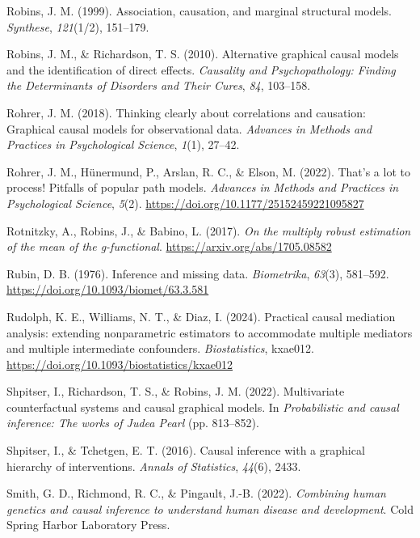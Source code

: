 \documentclass[
  single column]{article}
\newlength{\cslhangindent}
\newenvironment{CSLReferences}[2] %
 {\begin{list}{}{%
  \setlength{\itemindent}{0pt}
  \setlength{\leftmargin}{0pt}
  \setlength{\parsep}{0pt}
  \ifodd #1
   \setlength{\leftmargin}{\cslhangindent}
   \setlength{\itemindent}{-1\cslhangindent}
  \fi
  \setlength{\itemsep}{#2\baselineskip}}}
 {\end{list}}
\begin{document}
\begin{CSLReferences}{1}{0}
Robins, J. M. (1999). Association, causation, and marginal structural
models. \emph{Synthese}, \emph{121}(1/2), 151--179.

Robins, J. M., \& Richardson, T. S. (2010). Alternative graphical causal
models and the identification of direct effects. \emph{Causality and
Psychopathology: Finding the Determinants of Disorders and Their Cures},
\emph{84}, 103--158.

Rohrer, J. M. (2018). Thinking clearly about correlations and causation:
Graphical causal models for observational data. \emph{Advances in
Methods and Practices in Psychological Science}, \emph{1}(1), 27--42.

Rohrer, J. M., Hünermund, P., Arslan, R. C., \& Elson, M. (2022). That's
a lot to process! Pitfalls of popular path models. \emph{Advances in
Methods and Practices in Psychological Science}, \emph{5}(2).
\url{https://doi.org/10.1177/25152459221095827}

Rotnitzky, A., Robins, J., \& Babino, L. (2017). \emph{On the multiply
robust estimation of the mean of the g-functional}.
\url{https://arxiv.org/abs/1705.08582}

Rubin, D. B. (1976). Inference and missing data. \emph{Biometrika},
\emph{63}(3), 581--592. \url{https://doi.org/10.1093/biomet/63.3.581}

Rudolph, K. E., Williams, N. T., \& Diaz, I. (2024). {Practical causal
mediation analysis: extending nonparametric estimators to accommodate
multiple mediators and multiple intermediate confounders}.
\emph{Biostatistics}, kxae012.
\url{https://doi.org/10.1093/biostatistics/kxae012}

Shpitser, I., Richardson, T. S., \& Robins, J. M. (2022). Multivariate
counterfactual systems and causal graphical models. In
\emph{Probabilistic and causal inference: The works of {J}udea {P}earl}
(pp. 813--852).

Shpitser, I., \& Tchetgen, E. T. (2016). Causal inference with a
graphical hierarchy of interventions. \emph{Annals of Statistics},
\emph{44}(6), 2433.

Smith, G. D., Richmond, R. C., \& Pingault, J.-B. (2022).
\emph{Combining human genetics and causal inference to understand human
disease and development}. Cold Spring Harbor Laboratory Press.


\end{CSLReferences}
\end{document}
